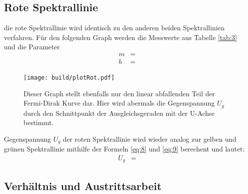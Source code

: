\newpage
\subsection{Rote Spektrallinie}

    \justifying die rote Spektrallinie wird identisch zu den anderen beiden Spektrallinien verfahren. Für den folgenden Graph werden die Messwerte aus Tabelle
    \ref{tab:3} und die Parameter
    \begin{align}
    m &= \text{} \label{eq:14}\\
    b &= \text{} \label{eq:15}
    \end{align}
    \justifying

    \begin{figure}[H]
        \centering
        \texttt{[image: build/plotRot.pdf]}
        \caption{Dieser Graph stellt ebenfalls nur den linear abfallenden Teil der Fermi-Dirak Kurve dar. Hier wird abermals die Gegenspannung $U_g$ durch den Schnittpunkt
        der Ausgleichsgeraden mit der U-Achse bestimmt.}
        \label{fig:9}
    \end{figure}

    \justifying Gegenspannung $U_g$ der roten Spektrallinie wird wieder analog zur gelben und grünen Spektrallinie mithilfe der Formeln \eqref{eq:8} und \eqref{eq:9} 
    berechent und lautet:
    \begin{align}
    U_g &=\text{} \label{eq:16}
    \end{align}

\newpage
\subsection{Verhältnis und Austrittsarbeit}


